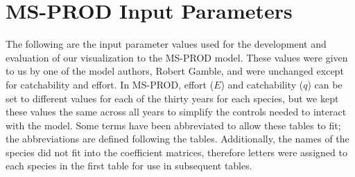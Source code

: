 \chapter{MS-PROD Input Parameters}

The following are the input parameter values used for the development and evaluation of our visualization to the MS-PROD model.  These values were given to us by one of the model authors, Robert Gamble, and were unchanged except for catchability and effort.  In MS-PROD, effort ($E$) and catchability ($q$) can be set to different values for each of the thirty years for each species, but we kept these values the same across all years to simplify the controls needed to interact with the model.  Some terms have been abbreviated to allow these tables to fit; the abbreviations are defined following the tables.  Additionally, the names of the species did not fit into the coefficient matrices, therefore letters were assigned to each species in the first table for use in subsequent tables.


{
}

